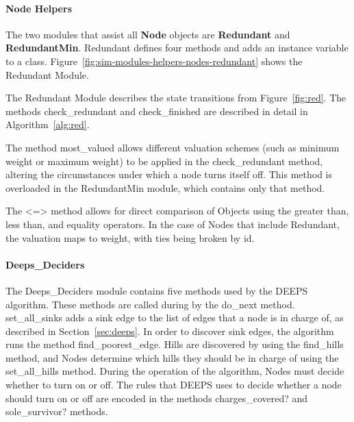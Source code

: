 \documentclass[technote, 10pt, letter]{IEEEtran}
\begin{document}
\paragraph{Node Helpers}

The two modules that assist all {\bfseries Node} objects are {\bfseries Redundant} and {\bfseries RedundantMin}. Redundant defines four methods and adds an instance variable to a class. Figure~\ref{fig:sim-modules-helpers-nodes-redundant} shows the Redundant Module.



The Redundant Module describes the state transitions from Figure~\ref{fig:red}. The methods {\ttfamily check\_redundant} and {\ttfamily check\_finished} are described in detail in Algorithm~\ref{alg:red}.

The method {\ttfamily most\_valued} allows different valuation schemes (such as minimum weight or maximum weight) to be applied in the {\ttfamily check\_redundant} method, altering the circumstances under which a node turns itself off. This method is overloaded in the RedundantMin module, which contains only that method.

The {\ttfamily <=>} method allows for direct comparison of Objects using the greater than, less than, and equality operators. In the case of Nodes that include Redundant, the valuation maps to {\ttfamily weight}, with ties being broken by {\ttfamily id}. 

\paragraph{Deeps\_Deciders}

The Deeps\_Deciders module contains five methods used by the DEEPS algorithm. These methods are called during by the {\ttfamily do\_next} method. {\ttfamily set\_all\_sinks} adds a sink edge to the list of edges that a node is in charge of, as described in Section~\ref{sec:deeps}. In order to discover sink edges, the algorithm runs the method {\ttfamily find\_poorest\_edge}. Hills are discovered by using the {\ttfamily find\_hills} method, and Nodes determine which hills they should be in charge of using the {\ttfamily set\_all\_hills} method. During the operation of the algorithm, Nodes must decide whether to turn on or off. The rules that DEEPS uses to decide whether a node should turn on or off are encoded in the methods {\ttfamily charges\_covered?} and {\ttfamily sole\_survivor?} methods.
\end{document}
